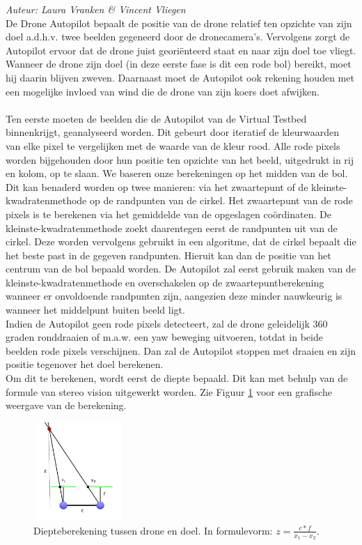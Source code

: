 {\em Auteur: Laura Vranken \& Vincent Vliegen}\\

\noindent
De Drone Autopilot bepaalt de positie van de drone relatief ten opzichte van zijn doel a.d.h.v. twee beelden gegeneerd door de dronecamera's. Vervolgens zorgt de Autopilot ervoor dat de drone juist geori\"enteerd staat en naar zijn doel toe vliegt. Wanneer de drone zijn doel (in deze eerste fase is dit een rode bol) bereikt, moet hij daarin blijven zweven. Daarnaast moet de Autopilot ook rekening houden met een mogelijke invloed van wind die de drone van zijn koers doet afwijken.
\\
\\
Ten eerste moeten de beelden die de Autopilot van de Virtual Testbed binnenkrijgt, geanalyseerd worden. Dit gebeurt door iteratief de kleurwaarden van elke pixel te vergelijken met de waarde van de kleur rood. Alle rode pixels worden bijgehouden door hun positie ten opzichte van het beeld, uitgedrukt in rij en kolom, op te slaan. We baseren onze berekeningen op het midden van de bol. Dit kan benaderd worden op twee manieren: via het zwaartepunt of de kleinste-kwadratenmethode op de randpunten van de cirkel. Het zwaartepunt van de rode pixels is te berekenen via het gemiddelde van de opgeslagen co\"ordinaten. De kleinste-kwadratenmethode zoekt daarentegen eerst de randpunten uit van de cirkel. Deze worden vervolgens gebruikt in een algoritme, dat de cirkel bepaalt die het beste past in de gegeven randpunten. Hieruit kan dan de positie van het centrum van de bol bepaald worden. \cite{website:kleinsteKwadraten} De Autopilot zal eerst gebruik maken van de kleinste-kwadratenmethode en overschakelen op de zwaartepuntberekening wanneer er onvoldoende randpunten zijn, aangezien deze minder nauwkeurig is wanneer het middelpunt buiten beeld ligt.
\\
Indien de Autopilot geen rode pixels detecteert, zal de drone geleidelijk 360 graden ronddraaien of m.a.w. een yaw beweging uitvoeren, totdat in beide beelden rode pixels verschijnen. Dan zal de Autopilot stoppen met draaien en zijn positie tegenover het doel berekenen.
\\
Om dit te berekenen, wordt eerst de diepte bepaald. Dit kan met behulp van de formule van stereo vision \cite{website:techbriefs} uitgewerkt worden.
Zie Figuur \ref{fig:DiepteberekeningDroneEnDoel} voor een grafische weergave van de berekening.
\begin{figure}[h]
	\centering
	\includegraphics[width=0.3\textwidth]{DiepteberekeningDroneEnDoel.png}
	\caption{Diepteberekening tussen drone en doel. In formulevorm: \(z = \frac{c * f}{x_1 - x_2}\).}
	\label{fig:DiepteberekeningDroneEnDoel}
\end{figure}
